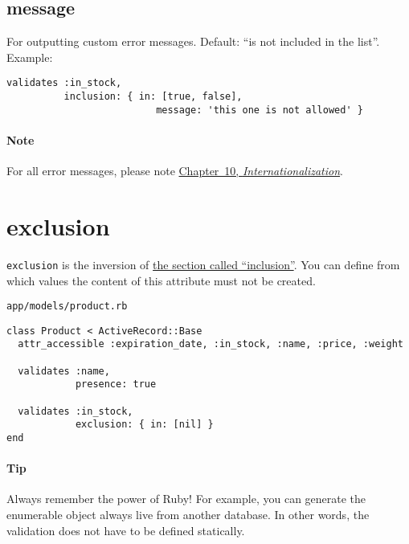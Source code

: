 \documentclass[a4paper]{book}
\newcounter{tab}[chapter]
\begin{document}
\subsection{message}\label{message}

For outputting custom error messages. Default: “is not included in the list”. Example:

\begin{shaded}\begin{verbatim}
validates :in_stock,
          inclusion: { in: [true, false],
                          message: 'this one is not allowed' }
\end{verbatim}\end{shaded}

\paragraph{Note}\label{note-29}

For all error messages, please note \hyperref[i18n]{Chapter~10, \emph{Internationalization}}.

\section{exclusion}\label{exclusion}

\texttt{exclusion} is the inversion of \hyperref[validatesux5finclusionux5fof]{the section called “inclusion”}. You can define from which values the content of this attribute must not be created.

\texttt{app/models/product.rb}

\begin{shaded}\begin{verbatim}
class Product < ActiveRecord::Base
  attr_accessible :expiration_date, :in_stock, :name, :price, :weight

  validates :name,
            presence: true

  validates :in_stock,
            exclusion: { in: [nil] }
end
\end{verbatim}\end{shaded}

\paragraph{Tip}\label{tip-12}

Always remember the power of Ruby! For example, you can generate the enumerable object always live from another database. In other words, the validation does not have to be defined statically.
\end{document}
